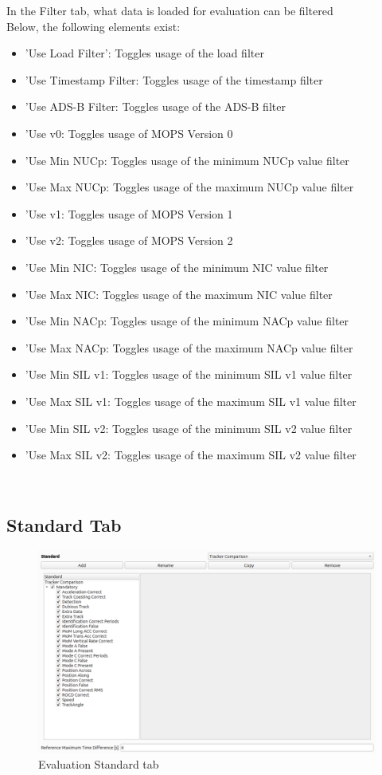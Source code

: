 In the Filter tab, what data is loaded for evaluation can be filtered \\

Below, the following elements exist:
\begin{itemize}  
\item 'Use Load Filter': Toggles usage of the load filter
\item 'Use Timestamp Filter: Toggles usage of the timestamp filter
\item 'Use ADS-B Filter: Toggles usage of the ADS-B filter
\item 'Use v0: Toggles usage of MOPS Version 0
\item 'Use Min NUCp: Toggles usage of the minimum NUCp value filter
\item 'Use Max NUCp: Toggles usage of the maximum NUCp value filter
\item 'Use v1: Toggles usage of MOPS Version 1
\item 'Use v2: Toggles usage of MOPS Version 2
\item 'Use Min NIC: Toggles usage of the minimum NIC value filter
\item 'Use Max NIC: Toggles usage of the maximum NIC value filter
\item 'Use Min NACp: Toggles usage of the minimum NACp value filter
\item 'Use Max NACp: Toggles usage of the maximum NACp value filter
\item 'Use Min SIL v1: Toggles usage of the minimum SIL v1 value filter
\item 'Use Max SIL v1: Toggles usage of the maximum SIL v1 value filter
\item 'Use Min SIL v2: Toggles usage of the minimum SIL v2 value filter
\item 'Use Max SIL v2: Toggles usage of the maximum SIL v2 value filter
\end{itemize}
\ \\

\subsection{Standard Tab}

\begin{figure}[H]
  \hspace*{-2cm}
    \includegraphics[width=18cm,frame]{figures/eval_standard.png}
  \caption{Evaluation Standard tab}
\end{figure}

